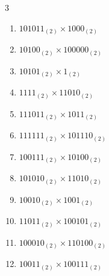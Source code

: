 \begin{multicols}{3}
\begin{enumerate}

\columnbreak %

\resetques

  \item $101011_{(2)} \times 1000_{(2)}$


  \item $10100_{(2)} \times 100000_{(2)}$


  \item $10101_{(2)} \times 1_{(2)}$


  \item $1111_{(2)} \times 11010_{(2)}$


  \item $111011_{(2)} \times 1011_{(2)}$


\columnbreak %

  \item $111111_{(2)} \times 101110_{(2)}$


  \item $100111_{(2)} \times 10100_{(2)}$


  \item $101010_{(2)} \times 11010_{(2)}$


  \item $10010_{(2)} \times 1001_{(2)}$


  \item $11011_{(2)} \times 100101_{(2)}$


\columnbreak %

  \item $100010_{(2)} \times 110100_{(2)}$


  \item $10011_{(2)} \times 100111_{(2)}$


\end{enumerate}
\end{multicols}
